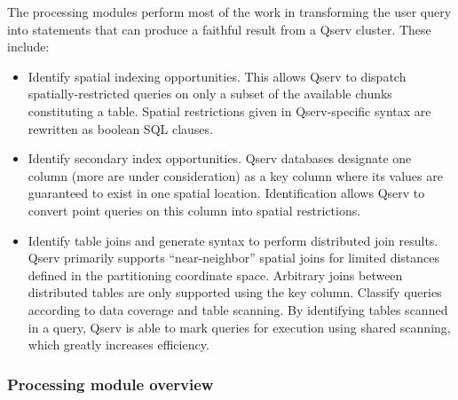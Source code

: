 \documentclass[DM,lsstdraft,toc]{lsstdoc}
\begin{document}
The processing modules perform most of the work in transforming the user
query into statements that can produce a faithful result from a Qserv
cluster. These include:

\begin{itemize}
\item
  Identify spatial indexing opportunities. This allows Qserv to dispatch
  spatially-restricted queries on only a subset of the available chunks
  constituting a table. Spatial restrictions given in Qserv-specific
  syntax are rewritten as boolean SQL clauses.
\item
  Identify secondary index opportunities. Qserv databases designate one
  column (more are under consideration) as a key column where its values
  are guaranteed to exist in one spatial location. Identification allows
  Qserv to convert point queries on this column into spatial
  restrictions.
\item
  Identify table joins and generate syntax to perform distributed join
  results. Qserv primarily supports ``near-neighbor'' spatial joins for
  limited distances defined in the partitioning coordinate space.
  Arbitrary joins between distributed tables are only supported using
  the key column. Classify queries according to data coverage and table
  scanning. By identifying tables scanned in a query, Qserv is able to
  mark queries for execution using shared scanning, which greatly
  increases efficiency.
\end{itemize}

\subsubsection{Processing module
overview}\label{processing-module-overview}
\end{document}
